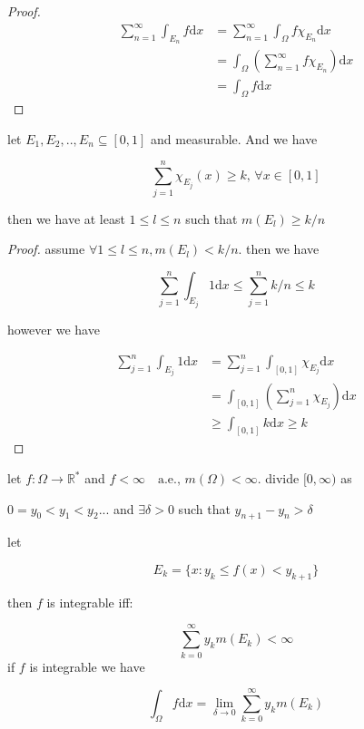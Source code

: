 \documentclass[11pt,a4paper]{article}
\begin{document}
\begin{proof}
    \begin{align*}
        \sum_{n=1}^{\infty} \int_{E_n} f \mathrm{d}x &= \sum_{n=1}^{\infty} \int_{\Omega} f \chi_{E_n}  \mathrm{d}x \\
        &= \int_{\Omega} \left( \sum_{n=1}^{\infty} f \chi_{E_n}  \right) \mathrm{d}x \\
        &= \int_{\Omega} f \mathrm{d}x
    \end{align*} 

\end{proof}

\begin{exercise}
    let $E_1, E_2, .. , E_n \subseteq [0,1]$ and measurable. And we have

    \[
        \sum_{j=1}^{n} \chi_{E_j}(x) \ge k,\, \forall x \in [0,1]
    \]

    then we have at least $1 \le l \le n$ such that  $m(E_l) \ge k/n$
\end{exercise}

\begin{proof}
    assume $\forall 1 \le l \le n, m(E_l) < k/n$. then we have 

    \[
        \sum_{j=1}^{n} \int_{E_j} 1 \mathrm{d}x \le \sum_{j=1}^{n} k/n \le k
    \]

    however we have

    \begin{align*}
        \sum_{j=1}^{n} \int_{E_j} 1 \mathrm{d}x &= \sum_{j=1}^{n} \int_{[0,1]} \chi_{E_j} \mathrm{d}x \\
        &= \int_{[0,1]} \left( \sum_{j=1}^{n}\chi_{E_j} \right) \mathrm{d}x \\
        & \ge \int_{[0,1]} k \mathrm{d}x \ge k 
    \end{align*}
\end{proof}


\begin{exercise}
    let $f: \Omega \to \mathbb{R}^*$ and $f < \infty \quad \text{a.e.},\, m(\Omega) < \infty$. divide $[0, \infty)$ as

    $0 = y_0 < y_1 < y_2 ...$ and $\exists \delta > 0$ such that $y_{n+1} - y_n > \delta$

    let 

    \[
        E_k = \{ x: y_k \le f(x) < y_{k+1}\}
    \]

    then $f$ is integrable iff:

    \[
        \sum_{k=0}^{\infty}y_k m(E_k) < \infty
    \]
    if $f$ is integrable we have

    \[
        \int_{\Omega} f \mathrm{d}x= \lim_{\delta \to 0} \sum_{k=0}^{\infty}y_k m(E_k) 
    \]
\end{exercise}
\end{document}
